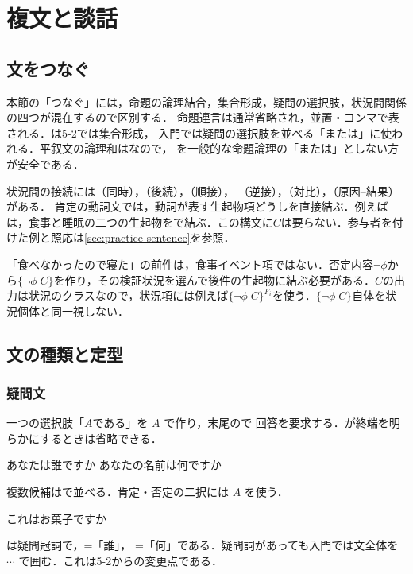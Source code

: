 \documentclass[../../main-detail.tex]{subfiles}
\begin{document}
\chapter{複文と談話}\label{chap:practice-discourse}
\section{文をつなぐ}

本節の「つなぐ」には，命題の論理結合，集合形成，疑問の選択肢，状況間関係の四つが混在するので区別する．
命題連言は通常省略され，並置・コンマで表される．は5-2では集合形成，
入門では疑問の選択肢を並べる「または」に使われる．平叙文の論理和はなので，
を一般的な命題論理の「または」としない方が安全である．

状況間の接続には（同時），（後続），（順接），
（逆接），（対比），（原因--結果）がある．
肯定の動詞文では，動詞が表す生起物項どうしを直接結ぶ．例えばは，食事と睡眠の二つの生起物をで結ぶ．この構文に$C$は要らない．参与者を付けた例と照応は\ref{sec:practice-sentence}を参照．
\begin{remark}[否定文の接続]
「食べなかったので寝た」の前件は，食事イベント項ではない．否定内容$\lnot\phi$から$\{\lnot\phi\;C\}$を作り，その検証状況を選んで後件の生起物に結ぶ必要がある．$C$の出力は状況のクラスなので，状況項には例えば$\{\lnot\phi\;C\}^{F_i}$を使う．$\{\lnot\phi\;C\}$自体を状況個体と同一視しない．
\end{remark}

\section{文の種類と定型}

\subsection{疑問文}
一つの選択肢「$A$である」を $A$ で作り，末尾ので
回答を要求する．が終端を明らかにするときは省略できる．
\begin{exe}
    \ex {}\hfill あなたは誰ですか
    \ex {}\hfill あなたの名前は何ですか
\end{exe}
複数候補はで並べる．肯定・否定の二択には $A$ を使う．
\begin{exe}
    \ex {}\hfill これはお菓子ですか
\end{exe}
は疑問冠詞で，=「誰」，
=「何」である．疑問詞があっても入門では文全体を
 $\cdots$ で囲む．これは5-2からの変更点である．
\end{document}
